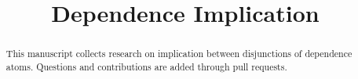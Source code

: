 \documentclass[11pt,a4paper]{article}
\title{Dependence Implication}
\author{}
\date{}
\begin{document}
\maketitle

\begin{abstract}
This manuscript collects research on implication between disjunctions
of dependence atoms. Questions and contributions are added through
pull requests.
\end{abstract}

\end{document}
